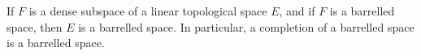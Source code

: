 If $F$ is a dense subspace of a linear topological space $E$, and if $F$ is a barrelled space, then $E$ is a barrelled space. In particular, a completion of a barrelled space is a barrelled space.
